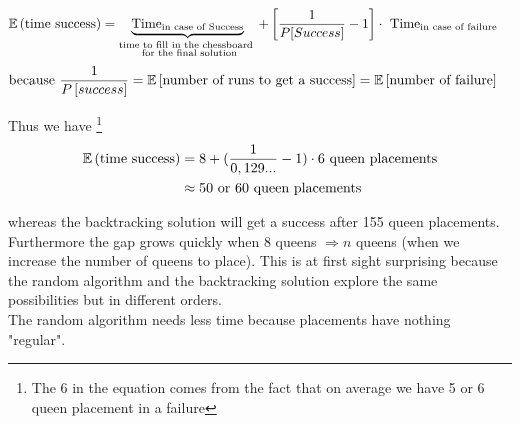 

\begin{align*}
\mathbb{E}\left( \text{time success}\right)&=\underbrace{\text{Time}_{\text{in case of Success}}}_{\substack{\text{time to fill in the chessboard }\\\text{ for the final solution}}} + \left[\frac{1}{P[Success]}-1\right]\cdot \text{ Time}_{\text{in case of failure}}
\end{align*}
\begin{align*}
\text{because } \frac{1}{P\left[success\right]}&=\mathbb{E}\left[\text{number of runs to get a success}\right]=\mathbb{E}\left[\text{number of failure}\right]
\end{align*}


Thus we have \footnote{The 6 in the equation comes from the fact that on average we have 5 or 6 queen placement in a failure}
\begin{align*}
\mathbb{E}\left( \text{time success}\right)&=8+(\frac{1}{0,129...}-1)\cdot 6 \text{ queen placements}\\
&\approx 50\text{ or }60\text{ queen placements}
\end{align*}

whereas the backtracking solution will get a success after 155 queen placements.\\

Furthermore the gap grows quickly when 8 queens $\Rightarrow n$ queens (when we increase the number of queens to place). This is at first sight surprising because the random algorithm and the backtracking solution explore the same possibilities but in different orders.\\

The random algorithm needs less time because placements have nothing "regular".
